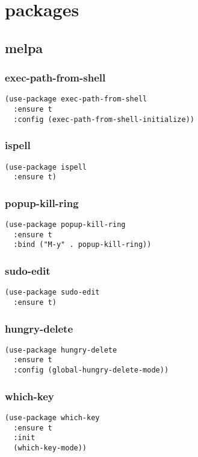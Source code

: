 \documentclass[11pt]{article}
\author{Nick Celestin Zizic}
\date{\today}
\title{}
\begin{document}
\tableofcontents

\section{packages}
\label{sec:org8d1eeb8}
\subsection{melpa}
\label{sec:org669a23d}
\subsubsection{exec-path-from-shell}
\label{sec:org3529877}
\begin{verbatim}
(use-package exec-path-from-shell
  :ensure t
  :config (exec-path-from-shell-initialize))
\end{verbatim}
\subsubsection{ispell}
\label{sec:org89c5a23}
\begin{verbatim}
(use-package ispell
  :ensure t)
\end{verbatim}
\subsubsection{popup-kill-ring}
\label{sec:orgf0c1f0b}
\begin{verbatim}
(use-package popup-kill-ring
  :ensure t
  :bind ("M-y" . popup-kill-ring))
\end{verbatim}
\subsubsection{sudo-edit}
\label{sec:org8e815e1}
\begin{verbatim}
(use-package sudo-edit
  :ensure t)
\end{verbatim}
\subsubsection{hungry-delete}
\label{sec:org06e48cf}
\begin{verbatim}
(use-package hungry-delete
  :ensure t
  :config (global-hungry-delete-mode))
\end{verbatim}
\subsubsection{which-key}
\label{sec:org2a18261}
\begin{verbatim}
(use-package which-key
  :ensure t
  :init
  (which-key-mode))
\end{verbatim}
\end{document}
